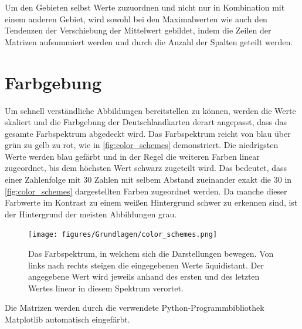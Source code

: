 Um den Gebieten selbst Werte zuzuordnen und nicht nur in Kombination mit einem anderen Gebiet, wird sowohl bei den Maximalwerten wie auch den Tendenzen der Verschiebung der Mittelwert gebildet, indem die Zeilen der Matrizen aufsummiert werden und durch die Anzahl der Spalten geteilt werden.
\newpage
\section{Farbgebung}\label{sec:Grundlagen:Farbgebung}
Um schnell verständliche Abbildungen bereitstellen zu können, werden die Werte skaliert und die Farbgebung der Deutschlandkarten derart angepasst, dass das gesamte Farbspektrum abgedeckt wird. Das Farbspektrum reicht von blau über grün zu gelb zu rot, wie in \autoref{fig:color_schemes} demonstriert. Die niedrigsten Werte werden blau gefärbt und in der Regel die weiteren Farben linear zugeordnet, bis dem höchsten Wert schwarz zugeteilt wird.
Das bedeutet, dass einer Zahlenfolge mit 30 Zahlen mit selbem Abstand zueinander exakt die 30 in \autoref{fig:color_schemes} dargestellten Farben zugeordnet werden.
Da manche dieser Farbwerte im Kontrast zu einem weißen Hintergrund schwer zu erkennen sind, ist der Hintergrund der meisten Abbildungen grau.

\begin{figure}[H]
    \centering
    \texttt{[image: figures/Grundlagen/color\_schemes.png]}
    \caption{Das Farbspektrum, in welchem sich die Darstellungen bewegen. Von links nach rechts steigen die eingegebenen Werte äquidistant. Der angegebene Wert wird jeweils anhand des ersten und des letzten Wertes linear in diesem Spektrum verortet.}
    \label{fig:color_schemes}
\end{figure}

Die Matrizen werden durch die verwendete Python-Programmbibliothek \glqq{}Matplotlib\grqq{} automatisch eingefärbt.